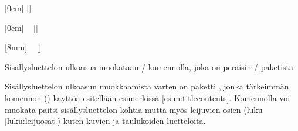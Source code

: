\begin{esimerkki*}

\begin{koodilohko}
  [0em]                                       %
  {\addvspace{1.5ex}\rmfamily\bfseries\large} %
  {\makebox[8mm][l]{\thecontentslabel}}       %
  {}                                          %
  {\small\titlerule[0bp]\contentspage}  %
  [\addvspace{.5ex}]                    %

  [0em]                                       %
  {\addvspace{.5ex}\rmfamily\normalsize}      %
  {\makebox[8mm][l]{\thecontentslabel}}       %
  {}                                          %
  {~\small{}\contentspage}   %
  [\addvspace{.2ex}]                          %

  [8mm]                                       %
  {\rmfamily\small}                           %
  {\makebox[10mm][l]{\thecontentslabel}}      %
  {}                                          %
  {~\small{}\contentspage}   %
  []                                          %
\end{koodilohko}
\caption{Sisällysluettelon ulkoasua muokataan \-/
  komennolla, joka on peräisin \-/ paketista}
\label{esim:titlecontents}
\end{esimerkki*}

Sisällysluettelon ulkoasun muokkaamista varten on paketti
, jonka tärkeimmän komennon
() käyttöä esitellään esimerkissä
\ref{esim:titlecontents}. Komennolla voi muokata paitsi
sisällysluettelon kohtia mutta myös leijuvien osien (luku
\ref{luku:leijuosat}) kuten kuvien ja taulukoiden luetteloita.

